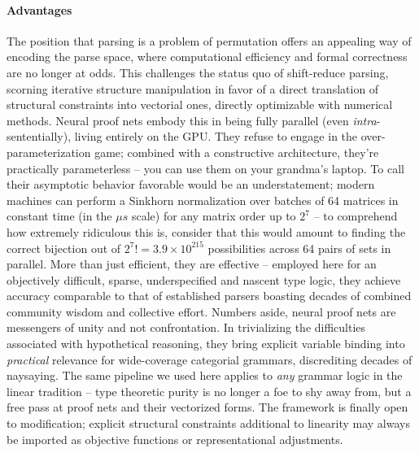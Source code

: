 \paragraph{Advantages}
The position that parsing is a problem of permutation offers an appealing way of encoding the parse space, where computational efficiency and formal correctness are no longer at odds.
This challenges the status quo of shift-reduce parsing, scorning iterative structure manipulation in favor of a direct translation of structural constraints into vectorial ones, directly optimizable with numerical methods.
Neural proof nets embody this in being fully parallel (even \textit{intra}-sententially), living entirely on the GPU.
They refuse to engage in the over-parameterization game; combined with a constructive architecture, they're practically parameterless -- you can use them on your grandma's laptop.
To call their asymptotic behavior favorable would be an understatement; modern machines can perform a Sinkhorn normalization over batches of 64 matrices in constant time (in the $\mu s$ scale) for any matrix order up to $2^7$ -- to comprehend how extremely ridiculous this is, consider that this would amount to finding the correct bijection out of ${2^7}! = 3.9\times 10^{215}$ possibilities across 64 pairs of sets in parallel.
More than just efficient, they are effective -- employed here for an objectively difficult, sparse, underspecified and nascent type logic, they achieve accuracy comparable to that of established parsers boasting decades of combined community wisdom and collective effort.
Numbers aside, neural proof nets are messengers of unity and not confrontation.
In trivializing the difficulties associated with hypothetical reasoning, they bring explicit variable binding into \textit{practical} relevance for wide-coverage categorial grammars, discrediting decades of naysaying.
The same pipeline we used here applies to \textit{any} grammar logic in the linear tradition -- type theoretic purity is no longer a foe to shy away from, but a free pass at proof nets and their vectorized forms.
The framework is finally open to modification; explicit structural constraints additional to linearity may always be imported as objective functions or representational adjustments.

